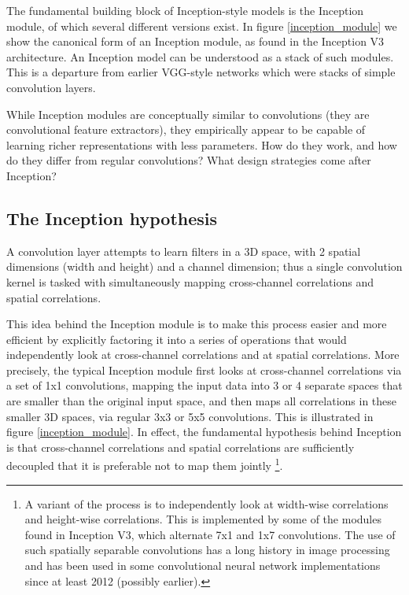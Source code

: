 The fundamental building block of Inception-style models is the Inception module, of which several different versions exist. In figure \ref{inception_module} we show the canonical form of an Inception module, as found in the Inception V3 architecture. An Inception model can be understood as a stack of such modules. This is a departure from earlier VGG-style networks which were stacks of simple convolution layers.

While Inception modules are conceptually similar to convolutions (they are convolutional feature extractors), they empirically appear to be capable of learning richer representations with less parameters. How do they work, and how do they differ from regular convolutions? What design strategies come after Inception?

\subsection{The Inception hypothesis}

A convolution layer attempts to learn filters in a 3D space, with 2 spatial dimensions (width and height) and a channel dimension; thus a single convolution kernel is tasked with simultaneously mapping cross-channel correlations and spatial correlations.

This idea behind the Inception module is to make this process easier and more efficient by explicitly factoring it into a series of operations that would independently look at cross-channel correlations and at spatial correlations. More precisely, the typical Inception module first looks at cross-channel correlations via a set of 1x1 convolutions, mapping the input data into 3 or 4 separate spaces that are smaller than the original input space, and then maps all correlations in these smaller 3D spaces, via regular 3x3 or 5x5 convolutions. This is illustrated in figure \ref{inception_module}. In effect, the fundamental hypothesis behind Inception is that cross-channel correlations and spatial correlations are sufficiently decoupled that it is preferable not to map them jointly \footnote{A variant of the process is to independently look at width-wise correlations and height-wise correlations. This is implemented by some of the modules found in Inception V3, which alternate 7x1 and 1x7 convolutions. The use of such spatially separable convolutions has a long history in image processing and has been used in some convolutional neural network implementations since at least 2012 (possibly earlier).}.

